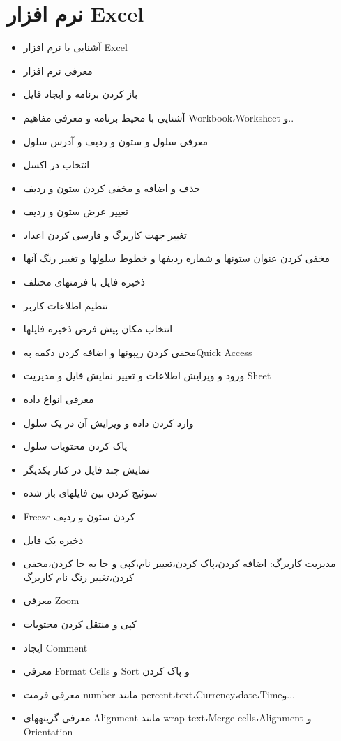 \section{ نرم افزار Excel}
\begin{itemize}
\item
آشنایی با نرم افزار Excel
\item
معرفی نرم افزار
\item
باز کردن برنامه و ایجاد فایل
\item
آشنایی با محیط برنامه و معرفی مفاهیم Workbook،Worksheet و..
\item
معرفی سلول و ستون و ردیف و آدرس سلول
\item
انتخاب در اکسل
\item
حذف و اضافه و مخفی کردن ستون و ردیف
\item
تغییر عرض ستون و ردیف
\item
تغییر جهت کاربرگ و فارسی کردن اعداد
\item
مخفی کردن عنوان ستونها و شماره ردیفها و خطوط سلولها و تغییر رنگ آنها
\item
ذخیره فایل با فرمتهای مختلف
\item
تنظیم اطلاعات کاربر
\item
انتخاب مکان پیش فرض ذخیره فایل­ها
\item
مخفی کردن ریبون­ها و اضافه کردن دکمه بهQuick Access
\item
ورود و ویرایش اطلاعات و تغییر نمایش فایل و مدیریت Sheet
\item
معرفی انواع داده
\item
وارد کردن داده و ویرایش آن در یک سلول
\item
پاک کردن محتویات سلول
\item
نمایش چند فایل در کنار یکدیگر
\item
سوئیچ کردن بین فایلهای باز شده
\item
Freeze کردن ستون و ردیف
\item
ذخیره یک فایل
\item
مدیریت کاربرگ: اضافه کردن،پاک کردن،تغییر نام،کپی و جا به جا کردن،مخفی کردن،تغییر رنگ نام کاربرگ
\item
معرفی Zoom
\item
کپی و منتقل کردن محتویات
\item
ایجاد Comment
\item
معرفی Format Cells و Sort و پاک کردن
\item
معرفی فرمت number مانند percent،text،Currency،date،Timeو...
\item
معرفی گزینه­های Alignment مانند wrap text،Merge cells،Alignment و Orientation

\end{itemize}

